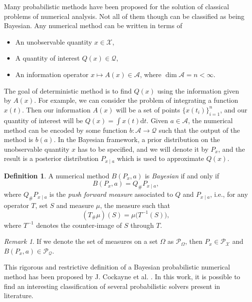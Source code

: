 \documentclass{scrartcl}
\theoremstyle{definition}
\newtheorem{definition}{Definition}
\theoremstyle{remark}
\newtheorem{remark}{Remark}
\numberwithin{definition}{section}
\numberwithin{remark}{section}
\newcommand{\dd}{\mathrm{d}}
\begin{document}
Many probabilistic methods have been proposed for the solution of classical problems of numerical analysis. Not all of them though can be classified as being Bayesian. Any numerical method can be written in terms of
\begin{itemize}
	\item An unobservable quantity $x \in \mathcal{X}$,
	\item A quantity of interest $Q(x) \in \mathcal{Q}$, 
	\item An information operator $x \mapsto A(x) \in \mathcal{A}$, where $\dim\mathcal{A} = n < \infty$.
\end{itemize}
The goal of deterministic method is to find $Q(x)$ using the information given by $A(x)$. For example, we can consider the problem of integrating a function $x(t)$. Then our information $A(x)$ will be a set of points $\{x(t_i)\}_{i=1}^n$, and our quantity of interest will be $Q(x) = \int x(t) \dd t$. Given $a \in \mathcal{A}$, the numerical method can be encoded by some function $b\colon\mathcal{A}\to\mathcal{Q}$ such that the output of the method is $b(a)$. In the Bayesian framework, a prior distribution on the unobservable quantity $x$ has to be specified, and we will denote it by $P_x$, and the result is a posterior distribution $P_{x\mid a}$ which is used to approximate $Q(x)$. 
\begin{definition}\label{def:BPNM} A numerical method $B(P_x, a)$ is \textit{Bayesian} if and only if 
	\begin{equation}
		B(P_x, a) = Q_\# P_{x\mid a},
	\end{equation}
	where $Q_\#P_{x\mid a}$ is the \textit{push forward measure} associated to $Q$ and $P_{x\mid a}$, i.e., for any operator $T$, set $S$ and measure $\mu$, the measure such that
	\begin{equation}
		(T_\# \mu)(S) = \mu\big(T^{-1}(S)\big),
	\end{equation}
	where $T^{-1}$ denotes the counter-image of $S$ through $T$.
\end{definition}
\begin{remark} If we denote the set of measures on a set $\Omega$ as $\mathcal P_{\Omega}$, then $P_x \in \mathcal{P}_{\mathcal{X}}$ and $B(P_x, a) \in \mathcal{P}_{\mathcal{Q}}$.	
\end{remark}
This rigorous and restrictive definition of a Bayesian probabilistic numerical method has been proposed by J. Cockayne et al. \cite{COS17}. In this work, it is possible to find an interesting classification of several probabilistic solvers present in literature.
\end{document}
